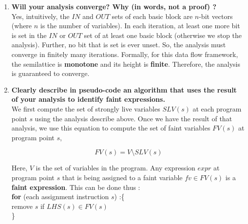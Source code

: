 \begin{enumerate}
\item \textbf{Will your analysis converge? Why (in words, not a proof) ?} \\

  Yes, intuitively, the $IN$ and $OUT$ sets of each basic block are $n$-bit vectors (where $n$ is the number of variables).
  In each iteration, at least one more bit is set in the $IN$ or $OUT$ set of at least one basic block (otherwise we stop the analysis).
  Further, no bit that is set is ever unset.
  So, the analysis must converge in finitely many iterations.
  Formally, for this data flow framework, the semilattice is \textbf{monotone} and its height is \textbf{finite}.
  Therefore, the analysis is guaranteed to converge.

\item \textbf{Clearly describe in pseudo-code an algorithm that uses the result of your analysis to identify faint expressions.} \\

  We first compute the set of strongly live variables $SLV(s)$ at each program point $s$ using the analysis describe above. Once we have the result of that analysis,
  we use this equation to compute the set of faint variables $FV(s)$ at program point $s$,

  $$FV(s) = V \setminus SLV(s)$$

  Here, $V$ is the set of variables in the program. Any expression $expr$ at program point $s$ that is being
  assigned to a faint variable $fv \in FV(s)$ is a \textbf{faint expression}. This can be done thus :\\
  
  \textbf{for} (each assignment instruction $s$) :\{\\
  remove $s$ if $LHS(s) \in FV(s)$\\  
  \}\\

\end{enumerate}

